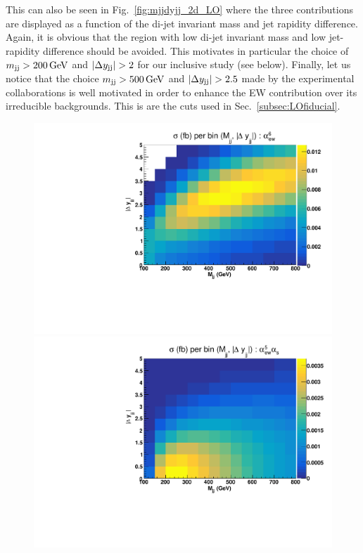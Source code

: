 This can also be seen in Fig.~\ref{fig:mjjdyjj_2d_LO} where the three contributions are displayed as a function of the di-jet invariant mass and jet rapidity difference.
Again, it is obvious that the region with low di-jet invariant mass and low jet-rapidity difference should be avoided.
This motivates in particular the choice of $m_{\text{j}\text{j}} > 200\,\text{GeV}$ and $|\Delta y_{\text{j}\text{j}}| > 2$ for our inclusive study (see below).
Finally, let us notice that the choice $m_{\text{j}\text{j}} > 500\,\text{GeV}$ and $|\Delta y_{\text{j}\text{j}}| > 2.5$ made by the experimental collaborations is well motivated in order to enhance the EW contribution over its irreducible backgrounds.
This is are the cuts used in Sec.~\ref{subsec:LOfiducial}.

\begin{figure}[ht]
\centering
\includegraphics[scale=0.395]{figures/scanfigures/scan_ew6.pdf}
\includegraphics[scale=0.395]{figures/scanfigures/scan_ew5qcd1.pdf}

\end{figure}
